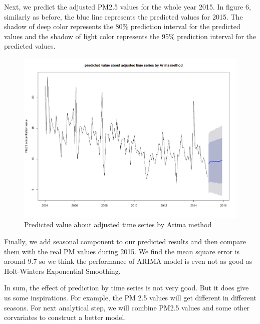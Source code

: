 \documentclass[10pt]{article}
\begin{document}
Next, we predict the adjusted PM2.5 values for the whole year 2015. In figure 6, similarly as before, the blue line represents the predicted values for 2015. The shadow of deep color represents the 80\% prediction interval for the predicted values and the shadow of light color represents the 95\% prediction interval for the predicted values.

\begin{figure}[ht!]
\centering
\includegraphics[width = 150mm]{ts6.png}
\caption{Predicted value about adjusted time series by Arima method}
\end{figure}

Finally, we add seasonal component to our predicted results and then compare them with the real PM values during 2015. We find the mean square error is around 9.7 so we think the performance of ARIMA model is even not as good as Holt-Winters Exponential Smoothing.

In sum, the effect of prediction by time series is not very good. But it does give us some inspirations. For example, the PM 2.5 values will get different in different seasons. For next analytical step, we will combine PM2.5 values and some other corvariates to construct a better model.



\end{document}
